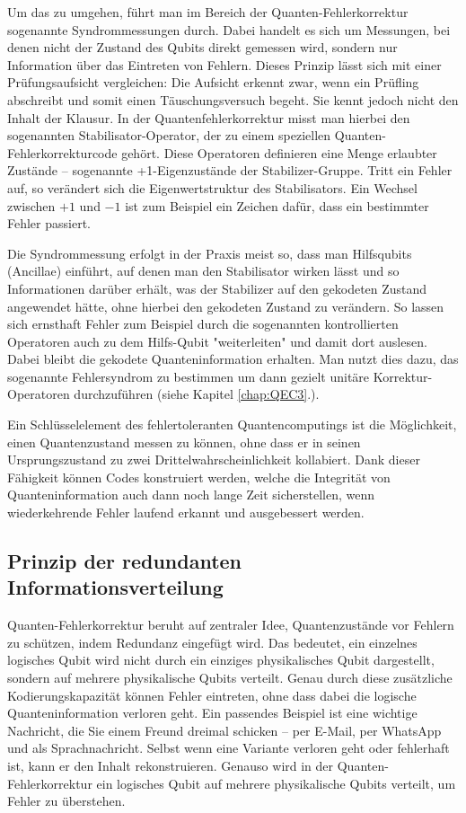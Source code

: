 Um das zu umgehen, führt man im Bereich der Quanten-Fehlerkorrektur sogenannte Syndrommessungen durch. Dabei handelt es sich um Messungen, bei denen nicht der Zustand des Qubits direkt gemessen wird, sondern nur Information über das Eintreten von Fehlern. Dieses Prinzip lässt sich mit einer Prüfungsaufsicht vergleichen: Die Aufsicht erkennt zwar, wenn ein Prüfling abschreibt und somit einen Täuschungsversuch begeht. Sie kennt jedoch nicht den Inhalt der Klausur. In der Quantenfehlerkorrektur misst man hierbei den sogenannten Stabilisator-Operator, der zu einem speziellen Quanten-Fehlerkorrekturcode gehört. Diese Operatoren definieren eine Menge erlaubter Zustände – sogenannte +1-Eigenzustände der Stabilizer-Gruppe. Tritt ein Fehler auf, so verändert sich die Eigenwertstruktur des Stabilisators. Ein Wechsel zwischen \(+1\) und \(-1\) ist zum Beispiel ein  Zeichen dafür, dass ein bestimmter Fehler passiert. \cite[Seite 444-446]{nielsen_quantum_2010}

Die Syndrommessung erfolgt in der Praxis meist so, dass man Hilfsqubits (Ancillae) einführt, auf denen man den Stabilisator wirken lässt und so Informationen darüber erhält, was der Stabilizer auf den gekodeten Zustand angewendet hätte, ohne hierbei den gekodeten Zustand zu verändern. So lassen sich ernsthaft Fehler zum Beispiel durch die sogenannten kontrollierten Operatoren auch zu dem Hilfs-Qubit "weiterleiten" und damit dort auslesen. Dabei bleibt die gekodete Quanteninformation erhalten. Man nutzt dies dazu, das sogenannte Fehlersyndrom zu bestimmen um dann gezielt unitäre Korrektur-Operatoren durchzuführen (siehe Kapitel \ref{chap:QEC3}.). \cite[Seite 444-446]{nielsen_quantum_2010}

Ein Schlüsselelement des fehlertoleranten Quantencomputings ist die Möglichkeit, einen Quantenzustand messen zu können, ohne dass er in seinen Ursprungszustand zu zwei Drittelwahrscheinlichkeit kollabiert. Dank dieser Fähigkeit können Codes konstruiert werden, welche die Integrität von Quanteninformation auch dann noch lange Zeit sicherstellen, wenn wiederkehrende Fehler laufend erkannt und ausgebessert werden.

\subsection{Prinzip der redundanten Informationsverteilung}
Quanten-Fehlerkorrektur beruht auf zentraler Idee, Quantenzustände vor Fehlern zu schützen, indem Redundanz eingefügt wird. Das bedeutet, ein einzelnes logisches Qubit wird nicht durch ein einziges physikalisches Qubit dargestellt, sondern auf mehrere physikalische Qubits verteilt. Genau durch diese zusätzliche Kodierungskapazität können Fehler eintreten, ohne dass dabei die logische Quanteninformation verloren geht. Ein passendes Beispiel ist eine wichtige Nachricht, die Sie einem Freund dreimal schicken – per E-Mail, per WhatsApp und als Sprachnachricht. Selbst wenn eine Variante verloren geht oder fehlerhaft ist, kann er den Inhalt rekonstruieren. Genauso wird in der Quanten-Fehlerkorrektur ein logisches Qubit auf mehrere physikalische Qubits verteilt, um Fehler zu überstehen.

